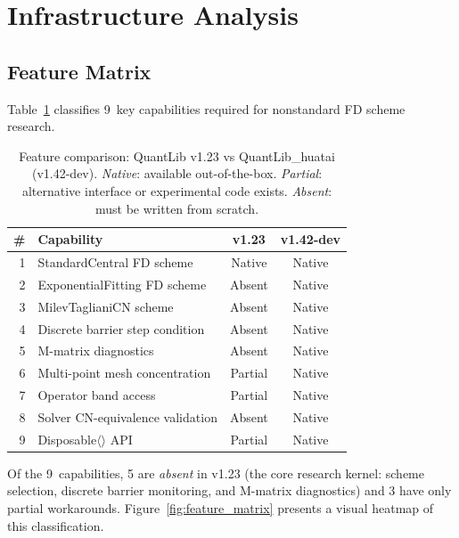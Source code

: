 \documentclass[11pt]{article}
\begin{document}
\section{Infrastructure Analysis}
\label{sec:infra}

\subsection{Feature Matrix}

Table~\ref{tab:features} classifies 9~key capabilities required for
nonstandard FD scheme research.

\begin{table}[htbp]
\centering
\caption{Feature comparison: QuantLib v1.23 vs QuantLib\_huatai (v1.42-dev).
  \emph{Native}: available out-of-the-box.
  \emph{Partial}: alternative interface or experimental code exists.
  \emph{Absent}: must be written from scratch.}
\label{tab:features}
\begin{tabular}{@{}rlcc@{}}
\toprule
\# & Capability & v1.23 & v1.42-dev \\
\midrule
1 & StandardCentral FD scheme       & Native  & Native  \\
2 & ExponentialFitting FD scheme    & Absent  & Native  \\
3 & MilevTaglianiCN scheme          & Absent  & Native  \\
4 & Discrete barrier step condition & Absent  & Native  \\
5 & M-matrix diagnostics            & Absent  & Native  \\
6 & Multi-point mesh concentration  & Partial & Native  \\
7 & Operator band access            & Partial & Native  \\
8 & Solver CN-equivalence validation& Absent  & Native  \\
9 & Disposable$\langle\rangle$ API  & Partial & Native  \\
\bottomrule
\end{tabular}
\end{table}

Of the 9~capabilities, 5 are \emph{absent} in v1.23 (the core research
kernel: scheme selection, discrete barrier monitoring, and M-matrix
diagnostics) and 3 have only partial workarounds. Figure~\ref{fig:feature_matrix}
presents a visual heatmap of this classification.
\end{document}
